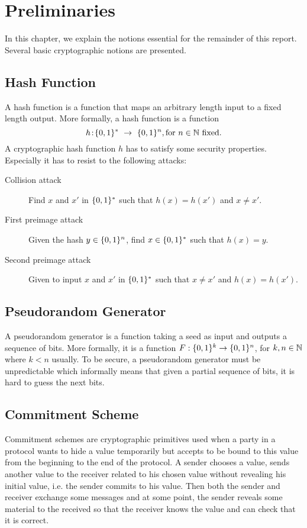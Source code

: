 \chapter{Preliminaries}
\label{chap:preliminaries}

In this chapter, 
we explain the notions essential for the remainder of this report. Several basic cryptographic notions are presented.

\section{Hash Function}
A hash function is a function that maps an arbitrary length input to a fixed length output.
More formally, a hash function is a function 
\[
    h\!:\!\{0,1\}^*~\rightarrow~\{0,1\}^n, \mbox{for $n \in \mathbb{N}$ fixed.}
\]
A cryptographic hash function $h$ has to satisfy some security properties. Especially it has to resist to the following attacks:
\begin{description}
    \item[Collision attack] Find $x$ and $x'$ in $\{0,1\}^*$ such that $h(x) = h(x')$ and $x \neq x'$.
    \item[First preimage attack] Given the hash $y \in \{0,1\}^n$, find $x \in \{0,1\}^*$ such that $h(x) = y$.
    \item[Second preimage attack] Given to input $x$ and $x'$ in $\{0,1\}^*$ such that $x \neq x'$ and $h(x) = h(x')$. 
\end{description}

\section{Pseudorandom Generator}
A pseudorandom generator is a function taking a seed as input and outputs a sequence of bits.
More formally, it is a function $F:\{0,1\}^k\rightarrow\{0,1\}^n$, for $k,n \in \mathbb{N}$ where $k < n$ usually.
To be secure, a pseudorandom generator must be unpredictable which informally means that given a partial sequence of bits, it is hard to guess the next bits.

\section{Commitment Scheme}
Commitment schemes are cryptographic primitives used when a party in a protocol wants to hide a value temporarily but accepts
to be bound to this value from the beginning to the end of the protocol.
A sender chooses a value, sends another value to the receiver related to his chosen value without revealing his initial value, i.e.
the sender commits to his value.
Then both the sender and receiver exchange some messages and at some point, the sender reveals some material to the received so that the receiver knows the value and can check that it is correct. 

